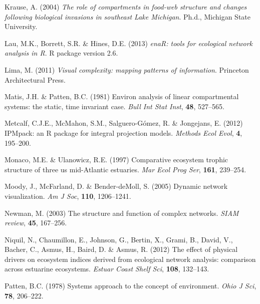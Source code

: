 \documentclass[11pt]{article}
\begin{document}
\begin{thebibliography}{75}
Krause, A. (2004) \emph{The role of compartments in food-web structure and
  changes following biological invasions in southeast {Lake Michigan}}.
\newblock Ph.d., Michigan State University.

Lau, M.K., Borrett, S.R. \& Hines, D.E. (2013) \emph{enaR: tools for ecological
  network analysis in R}.
\newblock R package version 2.6.

Lima, M. (2011) \emph{Visual complexity: mapping patterns of information}.
\newblock Princeton Architectural Press.

Matis, J.H. \& Patten, B.C. (1981) Environ analysis of linear compartmental
  systems: the static, time invariant case.
\newblock \emph{Bull Int Stat Inst}, \textbf{48}, 527--565.

Metcalf, C.J.E., McMahon, S.M., Salguero-G{\'o}mez, R. \& Jongejans, E. (2012)
  {IPM}pack: an {R} package for integral projection models.
\newblock \emph{Methods Ecol Evol}, \textbf{4}, 195--200.

Monaco, M.E. \& Ulanowicz, R.E. (1997) Comparative ecosystem trophic structure
  of three us mid-{A}tlantic estuaries.
\newblock \emph{Mar Ecol Prog Ser}, \textbf{161}, 239--254.

Moody, J., McFarland, D. \& Bender-deMoll, S. (2005) Dynamic network
  visualization.
\newblock \emph{Am J Soc}, \textbf{110}, 1206--1241.

Newman, M. (2003) The structure and function of complex networks.
\newblock \emph{SIAM review}, \textbf{45}, 167--256.

Niquil, N., Chaumillon, E., Johnson, G., Bertin, X., Grami, B., David, V.,
  Bacher, C., Asmus, H., Baird, D. \& Asmus, R. (2012) The effect of physical
  drivers on ecosystem indices derived from ecological network analysis:
  comparison across estuarine ecosystems.
\newblock \emph{Estuar Coast Shelf Sci}, \textbf{108}, 132--143.

Patten, B.C. (1978) Systems approach to the concept of environment.
\newblock \emph{Ohio J Sci}, \textbf{78}, 206--222.


\end{thebibliography}
\end{document}
